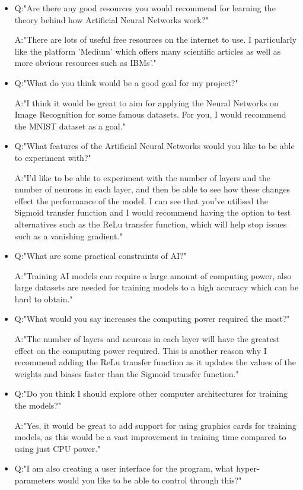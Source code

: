 \documentclass[./project-report/src/latex/project-report.tex]{subfiles}
\begin{document}
\begin{itemize}
    \item Q:"Are there any good resources you would recommend for learning the theory behind how Artificial Neural Networks work?"
    
          A:"There are lots of useful free resources on the internet to use. I particularly like the platform 'Medium' which offers many scientific articles 
             as well as more obvious resources such as IBMs'."
    \item Q:"What do you think would be a good goal for my project?"

          A:"I think it would be great to aim for applying the Neural Networks on Image Recognition for some famous datasets. For you, I would recommend 
             the MNIST dataset as a goal."
    \item Q:"What features of the Artificial Neural Networks would you like to be able to experiment with?"

          A:"I'd like to be able to experiment with the number of layers and the number of neurons in each layer, and then be able to see how these changes effect 
             the performance of the model. I can see that you've utilised the Sigmoid transfer function and I would recommend having the option to test alternatives 
              such as the ReLu transfer function, which will help stop issues such as a vanishing gradient."
    \item Q:"What are some practical constraints of AI?"

          A:"Training AI models can require a large amount of computing power, also large datasets are needed for training models to a high accuracy which can be hard 
             to obtain."
    \item Q:"What would you say increases the computing power required the most?"

          A:"The number of layers and neurons in each layer will have the greatest effect on the computing power required. This is another reason why I recommend adding 
             the ReLu transfer function as it updates the values of the weights and biases faster than the Sigmoid transfer function."
    \item Q:"Do you think I should explore other computer architectures for training the models?"

          A:"Yes, it would be great to add support for using graphics cards for training models, as this would be a vast improvement in training time compared to using 
             just CPU power."
    \item Q:"I am also creating a user interface for the program, what hyper-parameters would you like to be able to control through this?"


\end{itemize}
\end{document}
